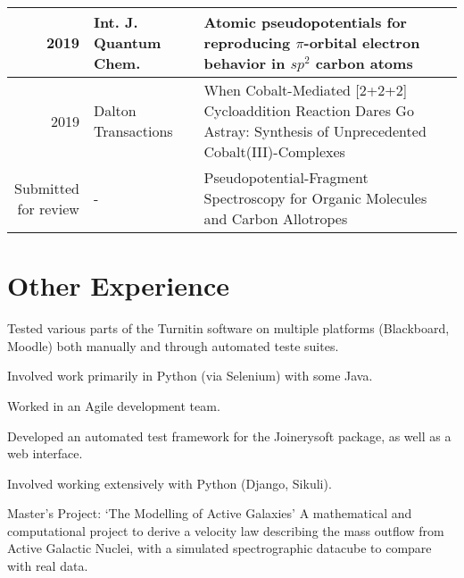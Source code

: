 \documentclass[letterpaper]{deedy-resume-openfont} %
\begin{document}
\begin{minipage}[t]{0.66\textwidth}
\begin{tabular}{rlm{7cm}}
2019 & Int. J. Quantum Chem. & Atomic pseudopotentials for reproducing $\pi$-orbital electron behavior in $sp^2$ carbon atoms \\
\hline
2019 & Dalton Transactions & When Cobalt-Mediated [2+2+2] Cycloaddition Reaction Dares Go Astray: Synthesis of Unprecedented  Cobalt(III)-Complexes \\
\hline
\makecell{Submitted \\ for review} & - & Pseudopotential-Fragment Spectroscopy for Organic Molecules and Carbon Allotropes
\end{tabular}

\sectionspace %


\section{Other Experience}


\begin{tightitemize}
\item Tested various parts of the Turnitin software on multiple platforms (Blackboard, Moodle) both manually and through automated teste suites.
\item Involved work primarily in Python (via Selenium) with some Java.
\item Worked in an Agile development team.
\end{tightitemize}

\sectionspace %




\begin{tightitemize}
\item Developed an automated test framework for the Joinerysoft package, as well as a web interface.
\item Involved working extensively with Python (Django, Sikuli).
\end{tightitemize}

\sectionspace %



\begin{tightitemize}
\item Master's Project: `The Modelling of Active Galaxies' A mathematical and computational project to derive a velocity law describing the mass outflow from Active Galactic Nuclei, with a simulated spectrographic datacube to compare with real data.
\end{tightitemize}

\end{minipage}
\end{document}
